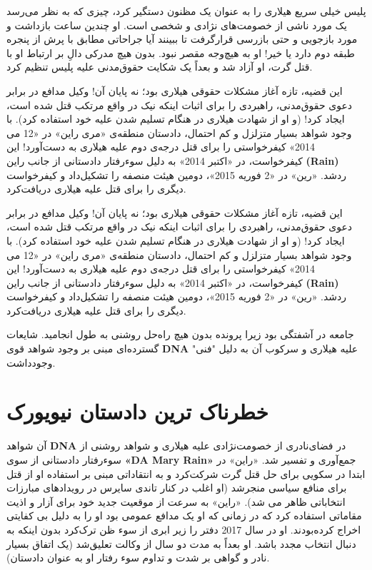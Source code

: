 پلیس خیلی سریع هیلاری را به عنوان یک مظنون دستگیر کرد، چیزی که به نظر می‌رسد یک مورد ناشی از خصومت‌های نژادی و شخصی است.
او چندین ساعت بازداشت و مورد بازجویی و حتی بازرسی قرار‌گرفت تا ببینند آیا جراحاتی مطابق با پرش از پنجره طبقه دوم دارد یا خیر!
او به هیچ‌وجه مقصر نبود.
بدون هیچ مدرکی دالِ بر ارتباط او با قتل گرت، او آزاد شد و بعداً یک شکایت حقوق‌مدنی علیه پلیس تنظیم کرد.

این قضیه، تازه آغاز مشکلات حقوقی هیلاری بود؛ نه پایان آن!
وکیل مدافع در برابر دعوی حقوق‌مدنی، راهبردی را برای اثبات اینکه نیک در واقع مرتکب قتل شده است، ایجاد کرد!
(و او از شهادت هیلاری در هنگام تسلیم شدن علیه خود استفاده کرد).
با وجود شواهد بسیار متزلزل و کم احتمال، دادستان منطقه‌ی «مری راین» در «12 می 2014» کیفرخواستی را برای قتل درجه‌ی دوم علیه هیلاری به دست‌آورد!
این کیفرخواست، در «اکتبر 2014» به دلیل سوء‌رفتار دادستانی از جانب راین \textenglish{\textbf{(Rain)}} ردشد.
«رین» در «2 فوریه 2015»، دومین هیئت منصفه را تشکیل‌داد و کیفرخواست دیگری را برای قتل علیه هیلاری دریافت‌کرد.

این قضیه، تازه آغاز مشکلات حقوقی هیلاری بود؛ نه پایان آن!
وکیل مدافع در برابر دعوی حقوق‌مدنی، راهبردی را برای اثبات اینکه نیک در واقع مرتکب قتل شده است، ایجاد کرد!
(و او از شهادت هیلاری در هنگام تسلیم شدن علیه خود استفاده کرد).
با وجود شواهد بسیار متزلزل و کم احتمال، دادستان منطقه‌ی «مری راین» در «12 می 2014» کیفرخواستی را برای قتل درجه‌ی دوم علیه هیلاری به دست‌آورد!
این کیفرخواست، در «اکتبر 2014» به دلیل سوء‌رفتار دادستانی از جانب راین \textenglish{\textbf{(Rain)}} ردشد.
«رین» در «2 فوریه 2015»، دومین هیئت منصفه را تشکیل‌داد و کیفرخواست دیگری را برای قتل علیه هیلاری دریافت‌کرد.

جامعه در آشفتگی بود زیرا پرونده بدون هیچ راه‌حل روشنی به طول انجامید.
شایعات گسترده‌ای مبنی بر وجود شواهد قوی \textenglish{\textbf{DNA}} علیه هیلاری و سرکوب آن به دلیل "فنی" وجود‌داشت.

\newpage

{
\section*{خطرناک ترین دادستان نیویورک}
\label{sec:خطرناک ترین دادستان نیویورک}
آن شواهد \textenglish{\textbf{DNA}} در فضای‌نادری از خصومت‌نژادی علیه هیلاری و شواهد روشنی از سوء‌رفتار دادستانی از سوی \textenglish{\textbf{«DA Mary Rain»}} جمع‌آوری و تفسیر شد. «راین» در ابتدا در سکویی برای حل قتل گرت شرکت‌کرد و به انتقاداتی مبنی بر استفاده او از قتل برای منافع سیاسی منجر‌شد (او اغلب در کنار تاندی سایرس در رویدادهای مبارزات انتخاباتی ظاهر می شد). «راین» به سرعت از موقعیت جدید خود برای آزار و اذیت مقاماتی استفاده کرد که در زمانی که او یک مدافع عمومی بود او را به دلیل بی کفایتی اخراج کرده‌بودند. او در سال 2017 دفتر را زیر ابری از سوء ظن ترک‌کرد بدون اینکه به دنبال انتخاب مجدد باشد. او بعداً به مدت دو سال از وکالت تعلیق‌شد (یک اتفاق بسیار نادر و گواهی بر شدت و تداوم سوء رفتار او به عنوان دادستان).
}

